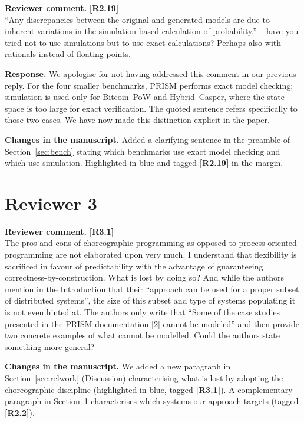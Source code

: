 \documentclass[11pt]{article}
\newcommand{\revcomment}[1]{%
  \begin{reviewercomment}
  \textbf{Reviewer comment.} #1
  \end{reviewercomment}
}
\newcommand{\revresponse}[2][]{%
  \par\noindent\textbf{Response.} #1 #2
}
\newcommand{\revchanges}[2][]{%
  \par\noindent\textbf{Changes in the manuscript.} #1
  #2\par\bigskip
}
\begin{document}
\revcomment{\textbf{[R2.19]}\\
``Any discrepancies between the original and generated models are
due to inherent variations in the simulation-based calculation of
probability.'' -- have you tried not to use simulations but to use
exact calculations? Perhaps also with rationals instead of floating
points.
}

\revresponse{ We apologise for not having addressed this comment
  in our previous reply. For the four smaller benchmarks, PRISM
  performs exact model checking; simulation is used only for
  Bitcoin~PoW and Hybrid~Casper, where the state space is too large
  for exact verification. The quoted sentence refers specifically
  to those two cases. We have now made this distinction explicit in
  the paper.}

\revchanges{ Added a clarifying sentence in the preamble of
  Section~\ref{sec:bench} stating which benchmarks use exact model
  checking and which use simulation. Highlighted in blue and tagged
  \textbf{[R2.19]} in the margin.}



\newpage

\section*{Reviewer 3}


\revcomment{\textbf{[R3.1]}\\
The pros and cons of choreographic programming as opposed to
process-oriented programming are not elaborated upon very much. I
understand that flexibility is sacrificed in favour of
predictability with the advantage of guaranteeing
correctness-by-construction. What is lost by doing so? And while
the authors mention in the Introduction that their ``approach can
be used for a proper subset of distributed systems'', the size of
this subset and type of systems populating it is not even hinted
at. The authors only write that ``Some of the case studies
presented in the PRISM documentation [2] cannot be modeled'' and
then provide two concrete examples of what cannot be modelled.
Could the authors state something more general?
}

\revchanges{ We added a new paragraph in
  Section~\ref{sec:relwork} (Discussion) characterising what is
  lost by adopting the choreographic discipline (highlighted in
  blue, tagged \textbf{[R3.1]}). A complementary paragraph in
  Section~1 characterises which systems our approach targets (tagged
  \textbf{[R2.2]}).}
\end{document}
